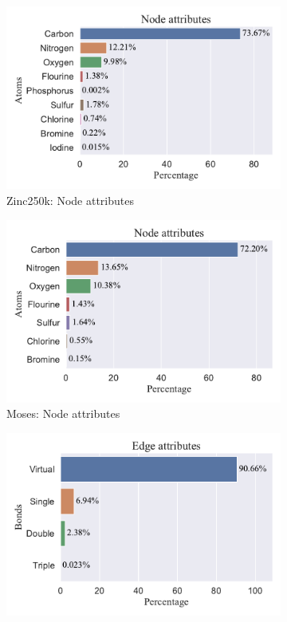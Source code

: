 \begin{figure}
\begin{subfigure}{0.49\textwidth}
       \includegraphics[width=\linewidth]{figures/experiments_figures/dataset_figures/zinc250k/zinc250k_node_attributes.pdf}
       \caption{Zinc250k: Node attributes}
    \end{subfigure}
    \hfill
    \begin{subfigure}{0.49\textwidth}
       \centering
       \includegraphics[width=\linewidth]{figures/experiments_figures/dataset_figures/moses/moses_node_attributes.pdf}
       \caption{Moses: Node attributes}
    \end{subfigure}
    \begin{subfigure}{0.49\textwidth}
       \centering
       \includegraphics[width=\linewidth]{figures/experiments_figures/dataset_figures/zinc250k/zinc250k_edge_attributes.pdf}

\end{subfigure}
\end{figure}
